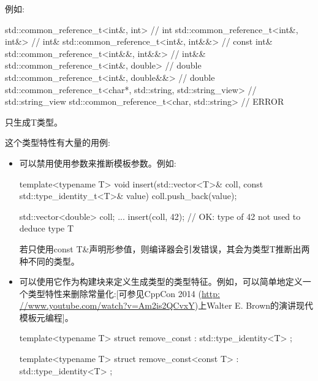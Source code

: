 例如:

\begin{cpp}
std::common_reference_t<int&, int> // int
std::common_reference_t<int&, int&> // int&
std::common_reference_t<int&, int&&> // const int&
std::common_reference_t<int&&, int&&> // int&&
std::common_reference_t<int&, double> // double
std::common_reference_t<int&, double&&> // double
std::common_reference_t<char*, std::string, std::string_view> // std::string_view
std::common_reference_t<char, std::string> // ERROR
\end{cpp}



只生成T类型。

这个类型特性有大量的用例:

\begin{itemize}
\item 
可以禁用使用参数来推断模板参数。例如:

\begin{cpp}
template<typename T>
void insert(std::vector<T>& coll, const std::type_identity_t<T>& value)
{
	coll.push_back(value);
}

std::vector<double> coll;
...
insert(coll, 42); // OK: type of 42 not used to deduce type T
\end{cpp}

若只使用const T\&声明形参值，则编译器会引发错误，其会为类型T推断出两种不同的类型。

\item 
可以使用它作为构建块来定义生成类型的类型特征。例如，可以简单地定义一个类型特性来删除常量化:[可参见CppCon 2014 (\url{http: //www.youtube.com/watch?v=Am2is2QCvxY})上Walter E. Brown的演讲现代模板元编程]。

\begin{cpp}
template<typename T>
struct remove_const : std::type_identity<T> {
};

template<typename T>
struct remove_const<const T> : std::type_identity<T> {
};
\end{cpp}
\end{itemize}




